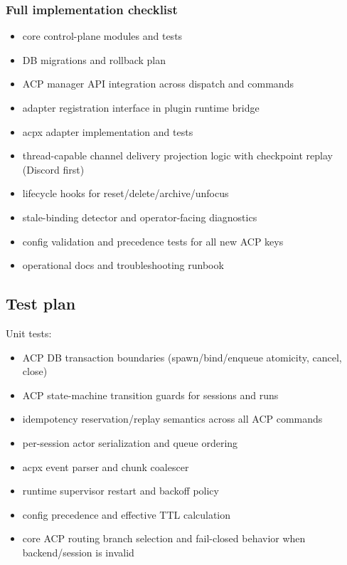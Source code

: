 \subsubsection{Full implementation checklist}


\begin{itemize}
  \item core control-plane modules and tests
  \item DB migrations and rollback plan
  \item ACP manager API integration across dispatch and commands
  \item adapter registration interface in plugin runtime bridge
  \item acpx adapter implementation and tests
  \item thread-capable channel delivery projection logic with checkpoint replay (Discord first)
  \item lifecycle hooks for reset/delete/archive/unfocus
  \item stale-binding detector and operator-facing diagnostics
  \item config validation and precedence tests for all new ACP keys
  \item operational docs and troubleshooting runbook
\end{itemize}


\subsection{Test plan}


Unit tests:

\begin{itemize}
  \item ACP DB transaction boundaries (spawn/bind/enqueue atomicity, cancel, close)
  \item ACP state-machine transition guards for sessions and runs
  \item idempotency reservation/replay semantics across all ACP commands
  \item per-session actor serialization and queue ordering
  \item acpx event parser and chunk coalescer
  \item runtime supervisor restart and backoff policy
  \item config precedence and effective TTL calculation
  \item core ACP routing branch selection and fail-closed behavior when backend/session is invalid
\end{itemize}


